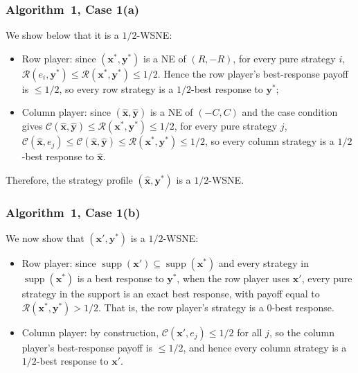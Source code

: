 \subsubsection{Algorithm~1, Case 1(a)}
\label{app:case-one-low}

We show below that it is a $1/2$-WSNE:

\begin{itemize}
  \item Row player: since $(\mathbf{x}^*, \mathbf{y}^*)$ is a NE of $(R, -R)$, for every pure strategy $i$, $\mathcal{R}(e_i, \mathbf{y}^*) \le \mathcal{R}(\mathbf{x}^*, \mathbf{y}^*) \le 1/2$. Hence the row player's best-response payoff is $\le 1/2$, so every row strategy is a $1/2$-best response to $\mathbf{y}^*$;
  \item Column player: since $(\hat{\mathbf{x}}, \hat{\mathbf{y}})$ is a NE of $(-C, C)$ and the case condition gives $\mathcal{C}(\hat{\mathbf{x}}, \hat{\mathbf{y}}) \le \mathcal{R}(\mathbf{x}^*, \mathbf{y}^*) \le 1/2$, for every pure strategy $j$, $\mathcal{C}(\hat{\mathbf{x}}, e_j) \le \mathcal{C}(\hat{\mathbf{x}}, \hat{\mathbf{y}}) \le \mathcal{R}(\mathbf{x}^*, \mathbf{y}^*) \le 1/2$, so every column strategy is a $1/2$-best response to $\hat{\mathbf{x}}$.
\end{itemize}

Therefore, the strategy profile $(\hat{\mathbf{x}}, \mathbf{y}^*)$ is a $1/2$-WSNE.

\subsubsection{Algorithm~1, Case 1(b)}
\label{app:case-one-low-high}

We now show that $(\mathbf{x}', \mathbf{y}^*)$ is a $1/2$-WSNE:

\begin{itemize}
  \item Row player: since $\operatorname{supp}(\mathbf{x}') \subseteq \operatorname{supp}(\mathbf{x}^*)$ and every strategy in $\operatorname{supp}(\mathbf{x}^*)$ is a best response to $\mathbf{y}^*$, when the row player uses $\mathbf{x}'$, every pure strategy in the support is an exact best response, with payoff equal to $\mathcal{R}(\mathbf{x}^*, \mathbf{y}^*) > 1/2$. That is, the row player's strategy is a $0$-best response.
  \item Column player: by construction, $\mathcal{C}(\mathbf{x}', e_j) \le 1/2$ for all $j$, so the column player's best-response payoff is $\le 1/2$, and hence every column strategy is a $1/2$-best response to $\mathbf{x}'$.
\end{itemize}

